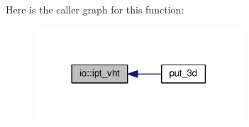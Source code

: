 Here is the caller graph for this function\+:\nopagebreak
\begin{figure}[H]
\begin{center}
\leavevmode
\includegraphics[width=221pt]{namespaceio_abed61f2af0a37265b7a1d15300f61996_icgraph}
\end{center}
\end{figure}


